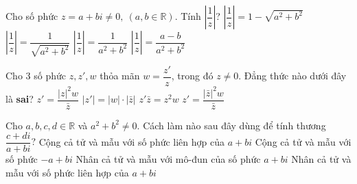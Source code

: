 \begin{ex}%
	Cho số phức $ z=a+bi\neq 0,\ (a, b\in\mathbb{R}) $. Tính $ \left|\dfrac{1}{z}\right| $?
	\choice
	{$ \left|\dfrac{1}{z}\right| =1-\sqrt{a^2+b^2}$}
	{\True $ \left|\dfrac{1}{z}\right| =\dfrac{1}{\sqrt{a^2+b^2}}$}
	{$ \left|\dfrac{1}{z}\right| =\dfrac{1}{a^2+b^2}$}
	{$ \left|\dfrac{1}{z}\right| =\dfrac{a-b}{a^2+b^2}$}
\end{ex}

\begin{ex}%
	Cho 3 số phức $ z, z', w $ thỏa mãn $ w=\dfrac{z'}{z} $, trong đó $ z\neq 0 $. Đẳng thức nào dưới đây là {\bf sai}?
	\choice
	{$ z'=\dfrac{|z|^2w}{\bar{z}} $}
	{$ \left|z'\right|=\left|w\right|\cdot\left|\bar{z}\right| $}
	{\True $ z'\bar{z}=z^2w $}
	{$ z'=\dfrac{\left|\bar{z}\right|^2w}{\bar{z}} $}
\end{ex}

\begin{ex}%
	Cho $ a, b, c, d\in\mathbb{R} $ và $ a^2+b^2\neq 0 $. Cách làm nào sau đây dùng để tính thương $ \dfrac{c+di}{a+bi} $?	
	\choice
	{Cộng cả tử và mẫu với số phức liên hợp của $ a+bi $}
	{Cộng cả tử và mẫu với số phức  $-a+bi $}
	{Nhân cả tử và mẫu với mô-đun của số phức  $ a+bi $}
	{\True Nhân cả tử và mẫu với số phức liên hợp của $ a+bi $}
\end{ex}

